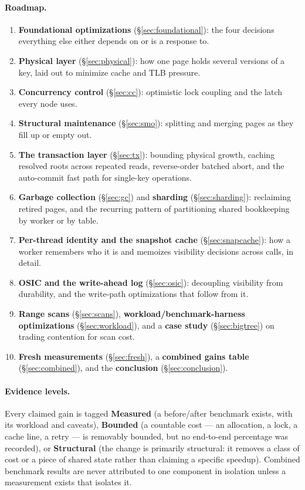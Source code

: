 \documentclass[11pt]{article}
\newcommand{\gainmeasured}{\textbf{Measured}}
\newcommand{\gainbounded}{\textbf{Bounded}}
\newcommand{\gainenabling}{\textbf{Structural}}
\begin{document}
\paragraph{Roadmap.}
\begin{enumerate}
  \item \textbf{Foundational optimizations} (\S\ref{sec:foundational}): the four
        decisions everything else either depends on or is a response to.
  \item \textbf{Physical layer} (\S\ref{sec:physical}): how one page holds several
        versions of a key, laid out to minimize cache and TLB pressure.
  \item \textbf{Concurrency control} (\S\ref{sec:cc}): optimistic lock coupling and
        the latch every node uses.
  \item \textbf{Structural maintenance} (\S\ref{sec:smo}): splitting and merging
        pages as they fill up or empty out.
  \item \textbf{The transaction layer} (\S\ref{sec:tx}): bounding physical growth,
        caching resolved roots across repeated reads, reverse-order batched abort,
        and the auto-commit fast path for single-key operations.
  \item \textbf{Garbage collection} (\S\ref{sec:gc}) and \textbf{sharding}
        (\S\ref{sec:sharding}): reclaiming retired pages, and the recurring pattern
        of partitioning shared bookkeeping by worker or by table.
  \item \textbf{Per-thread identity and the snapshot cache} (\S\ref{sec:snapcache}):
        how a worker remembers who it is and memoizes visibility decisions across
        calls, in detail.
  \item \textbf{OSIC and the write-ahead log} (\S\ref{sec:osic}): decoupling
        visibility from durability, and the write-path optimizations that follow
        from it.
  \item \textbf{Range scans} (\S\ref{sec:scans}), \textbf{workload/benchmark-harness
        optimizations} (\S\ref{sec:workload}), and a \textbf{case study}
        (\S\ref{sec:bigtree}) on trading contention for scan cost.
  \item \textbf{Fresh measurements} (\S\ref{sec:fresh}), a \textbf{combined gains
        table} (\S\ref{sec:combined}), and the \textbf{conclusion}
        (\S\ref{sec:conclusion}).
\end{enumerate}

\paragraph{Evidence levels.} Every claimed gain is tagged \gainmeasured{} (a
before/after benchmark exists, with its workload and caveats), \gainbounded{} (a
countable cost --- an allocation, a lock, a cache line, a retry --- is removably
bounded, but no end-to-end percentage was recorded), or \gainenabling{} (the change
is primarily structural: it removes a class of cost or a piece of shared state
rather than claiming a specific speedup). Combined benchmark results are never
attributed to one component in isolation unless a measurement exists that isolates
it.
\end{document}
